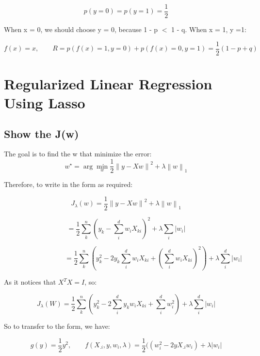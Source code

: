 \documentclass{article} %
\newcommand{\argmin}{\arg\!\min}
\newcommand{\norm}[1]{\left\lVert #1 \right\rVert}
\newcommand{\abs}[1]{\left\lvert #1 \right\rvert}
\begin{document}
\begin{equation}
p(y=0) = p(y=1) = \frac{1}{2}
\end{equation}

When x = 0, we should choose y = 0, because 1 - p $<$ 1 - q. When x = 1, y =1:

\begin{equation}
f(x) = x , \qquad R = p(f(x)=1, y=0) + p(f(x)=0, y=1) = \frac{1}{2} (1-p+q)
\end{equation}



\section{Regularized Linear Regression Using Lasso}


\subsection{Show the J(w)}
The goal is to find the w that minimize the error:
\begin{equation}
w^{\star} = \argmin_w \frac{1}{2} \norm{ y - Xw }^2 + \lambda \norm{ w }_1
\end{equation}

Therefore, to write in the form as required:

\begin{equation}
J_{\lambda} (w) = \frac{1}{2} \norm{ y - Xw }^2 + \lambda \norm{ w }_1
\end{equation}

\begin{equation}
= \frac{1}{2} \sum_k^n (y_k - \sum_i^d w_i X_{ki})^2 + \lambda \sum_i \abs{w_i}
\end{equation}

\begin{equation}
\qquad \qquad \qquad \qquad = \frac{1}{2} \sum_k^n (y_k^2 - 2 y_k \sum_i^d w_i X_{ki}
+ (\sum_i^d w_i X_{ki})^2) + \lambda \sum_i^d \abs{w_i}
\end{equation}

As it notices that $X^T X = I$, so:

\begin{equation}
J_{\lambda} (W)= \frac{1}{2} \sum_k^n (y_k^2 - 2 \sum_i^d y_k w_i X_{ki} + \sum_i^d w_i^2)
+ \lambda \sum_i^d \abs{w_i}
\end{equation}

So to transfer to the form, we have:

\begin{equation}
g(y) = \frac{1}{2} y^2 , \qquad f(X_{.i}, y, w_i, \lambda) =
\frac{1}{2} ((w_i^2  - 2 y X_{.i} w_i) + \lambda \abs{w_i}
\end{equation}
\end{document}
